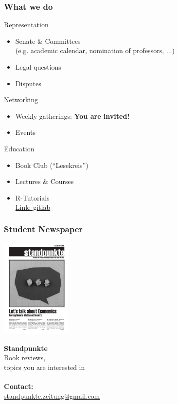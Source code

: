 \documentclass{beamer}
\begin{document}
\begin{frame}
  \frametitle{What we do}
  \begin{block}{Representation}
    \begin{itemize}
    \item Senate \& Committees \\
      (e.g. academic calendar, nomination of professors, $\dots$)
    \item Legal questions
    \item Disputes
    \end{itemize}
  \end{block}
  \begin{block}{Networking}
    \begin{itemize}
    \item Weekly gatherings: \textbf{You are invited!}
    \item Events
    \end{itemize}
  \end{block}
  \begin{block}{Education}
    \begin{itemize}
    \item Book Club (``Lesekreis'')
    \item Lectures \& Courses
    \item R-Tutorials \\
      \href{https://gitlab.com/r-students-WU/}{Link: gitlab}
    \end{itemize}
  \end{block}
\end{frame}

\begin{frame}
  \frametitle{Student Newspaper}
  \begin{minipage}{4cm}
\includegraphics[height=5cm, width=3.5cm]{standpunkte_cover.png}
\end{minipage}%
\begin{minipage}{7cm}
\textbf{Standpunkte} \\ Book reviews, \\ topics you are interested in \\\\ \textbf{Contact:} \\ \href{mailto:standpunkte.zeitung@gmail.com}{standpunkte.zeitung@gmail.com}
\end{minipage}
  \end{frame}
\end{document}
